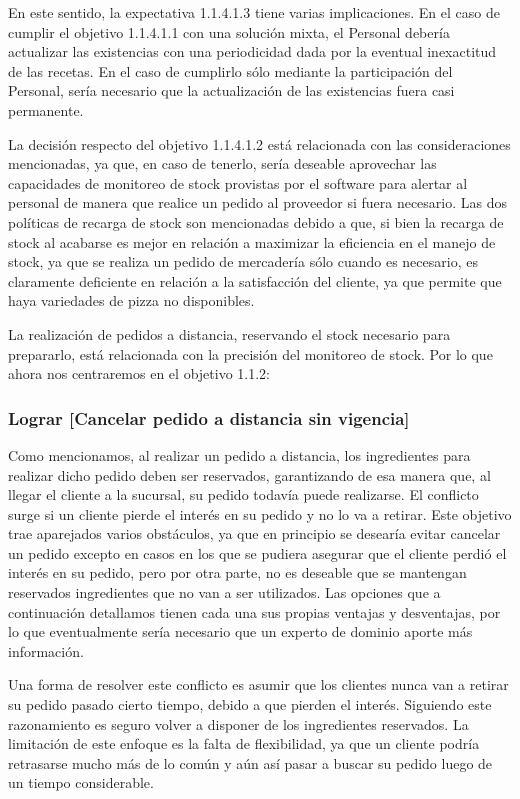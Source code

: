 \documentclass[a4paper,10pt]{article}
\begin{document}
En este sentido, la expectativa 1.1.4.1.3 tiene varias implicaciones. En el caso de cumplir el objetivo 1.1.4.1.1 con una solución mixta, el Personal debería actualizar las existencias con una periodicidad dada por la eventual inexactitud de las recetas. En el caso de cumplirlo sólo mediante la participación del Personal, sería necesario que la actualización de las existencias fuera casi permanente.

La decisión respecto del objetivo 1.1.4.1.2 está relacionada con las consideraciones mencionadas, ya que, en caso de tenerlo, sería deseable aprovechar las capacidades de monitoreo de stock provistas por el software para alertar al personal de manera que realice un pedido al proveedor si fuera necesario. Las dos políticas de recarga de stock son mencionadas debido a que, si bien la recarga de stock al acabarse es mejor en relación a maximizar la eficiencia en el manejo de stock, ya que se realiza un pedido de mercadería sólo cuando es necesario, es claramente deficiente en relación a la satisfacción del cliente, ya que permite que haya variedades de pizza no disponibles.


La realización de pedidos a distancia, reservando el stock necesario para prepararlo, está relacionada con la precisión del monitoreo de stock. Por lo que ahora nos centraremos en el objetivo 1.1.2:
\subsubsection*{Lograr [Cancelar pedido a distancia sin vigencia]}
Como mencionamos, al realizar un pedido a distancia, los ingredientes para realizar dicho pedido deben ser reservados, garantizando de esa manera que, al llegar el cliente a la sucursal, su pedido todavía puede realizarse. El conflicto surge si un cliente pierde el interés en su pedido y no lo va a retirar.
Este objetivo trae aparejados varios obstáculos, ya que en principio se desearía evitar cancelar un pedido excepto en casos en los que se pudiera asegurar que el cliente perdió el interés en su pedido, pero por otra parte, no es deseable que se mantengan reservados ingredientes que no van a ser utilizados.
Las opciones que a continuación detallamos tienen cada una sus propias ventajas y desventajas, por lo que eventualmente sería necesario que un experto de dominio aporte más información.


Una forma de resolver este conflicto es asumir que los clientes nunca van a retirar su pedido pasado cierto tiempo, debido a que pierden el interés. Siguiendo este razonamiento es seguro volver a disponer de los ingredientes reservados. La limitación de este enfoque es la falta de flexibilidad, ya que un cliente podría retrasarse mucho más de lo común y aún así pasar a buscar su pedido luego de un tiempo considerable.
\end{document}
